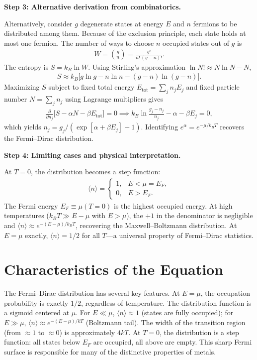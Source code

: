 \documentclass[11pt,openright]{book}
\begin{document}
\textbf{Step 3: Alternative derivation from combinatorics.}

Alternatively, consider $g$ degenerate states at energy $E$ and $n$ fermions to be distributed among them. Because of the exclusion principle, each state holds at most one fermion. The number of ways to choose $n$ occupied states out of $g$ is
\begin{align}
W = \binom{g}{n} = \frac{g!}{n!\,(g-n)!}.
\end{align}
The entropy is $S = k_B \ln W$. Using Stirling's approximation $\ln N! \approx N\ln N - N$,
\begin{align}
S \approx k_B\bigl[g\ln g - n\ln n - (g-n)\ln(g-n)\bigr].
\end{align}
Maximizing $S$ subject to fixed total energy $E_{\text{tot}} = \sum_j n_j E_j$ and fixed particle number $N = \sum_j n_j$ using Lagrange multipliers gives
\begin{align}
\frac{\partial}{\partial n_j}\bigl[S - \alpha N - \beta E_{\text{tot}}\bigr] = 0 \implies k_B\ln\frac{g_j - n_j}{n_j} - \alpha - \beta E_j = 0,
\end{align}
which yields $n_j = g_j/(\exp[\alpha + \beta E_j] + 1)$. Identifying $e^\alpha = e^{-\mu/k_BT}$ recovers the Fermi--Dirac distribution.

\textbf{Step 4: Limiting cases and physical interpretation.}

At $T = 0$, the distribution becomes a step function:
\begin{align}
\langle n \rangle = \begin{cases} 1, & E < \mu = E_F, \\ 0, & E > E_F. \end{cases}
\end{align}
The Fermi energy $E_F \equiv \mu(T=0)$ is the highest occupied energy. At high temperatures ($k_BT \gg E - \mu$ with $E > \mu$), the $+1$ in the denominator is negligible and $\langle n \rangle \approx e^{-(E-\mu)/k_BT}$, recovering the Maxwell--Boltzmann distribution. At $E = \mu$ exactly, $\langle n \rangle = 1/2$ for all $T$---a universal property of Fermi--Dirac statistics.

\section*{Characteristics of the Equation}

The Fermi--Dirac distribution has several key features. At $E = \mu$, the occupation probability is exactly $1/2$, regardless of temperature. The distribution function is a sigmoid centered at $\mu$. For $E \ll \mu$, $\langle n \rangle \approx 1$ (states are fully occupied); for $E \gg \mu$, $\langle n \rangle \approx e^{-(E-\mu)/kT}$ (Boltzmann tail). The width of the transition region (from $\approx 1$ to $\approx 0$) is approximately $4kT$. At $T = 0$, the distribution is a step function: all states below $E_F$ are occupied, all above are empty. This sharp Fermi surface is responsible for many of the distinctive properties of metals.
\end{document}
